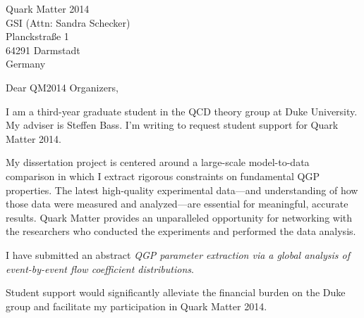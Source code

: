 \documentclass[letterpaper,10pt]{letter}
\begin{document}
\begin{letter}{
  Quark Matter 2014 \\
  GSI (Attn: Sandra Schecker) \\
  Planckstra\ss e 1 \\
  64291 Darmstadt \\
  Germany
}

\opening{Dear QM2014 Organizers,}


I am a third-year graduate student in the QCD theory group at Duke University.  My adviser is Steffen Bass.  I'm writing to request student
support for Quark Matter 2014.


My dissertation project is centered around a large-scale model-to-data comparison in which I extract rigorous constraints on fundamental QGP
properties.  
The latest high-quality experimental data---and understanding of how those data were measured and analyzed---are essential for meaningful,
accurate results.
Quark Matter provides an unparalleled opportunity for networking with the researchers who conducted the experiments and performed the data
analysis.

I have submitted an abstract \emph{QGP parameter extraction via a global analysis of event-by-event flow coefficient distributions}.

Student support would significantly alleviate the financial burden on the Duke group and facilitate my participation in Quark Matter 2014.




%



%  
%  




\end{letter}
\end{document}
